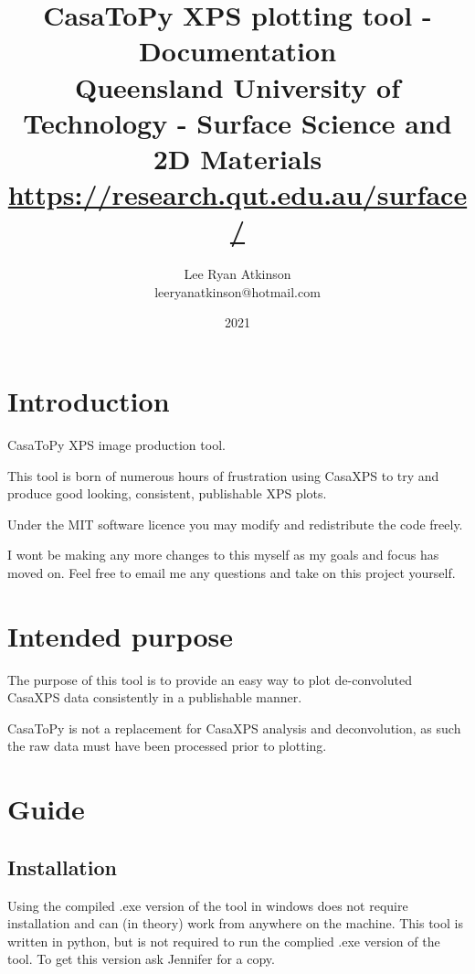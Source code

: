 \documentclass[10pt]{report}
\begin{document}
\title{CasaToPy XPS plotting tool - Documentation \\\large Queensland University of Technology - Surface Science and 2D Materials \href{https://research.qut.edu.au/surface/}{https://research.qut.edu.au/surface/}}
\author{Lee Ryan Atkinson \\ leeryanatkinson@hotmail.com}
\date{2021}
\maketitle
{}

\pagebreak

\section{Introduction}

CasaToPy XPS image production tool.

This tool is born of numerous hours of frustration using CasaXPS to try and produce good looking, consistent, publishable XPS plots.

Under the MIT software licence you may modify and redistribute the code freely.

I wont be making any more changes to this myself as my goals and focus has moved on. Feel free to email me any questions and take on this project yourself.

\section{Intended purpose}

The purpose of this tool is to provide an easy way to plot de-convoluted CasaXPS data consistently in a publishable manner.

CasaToPy is not a replacement for CasaXPS analysis and deconvolution, as such the raw data must have been processed prior to plotting.

\section{Guide}
\subsection{Installation}

Using the compiled .exe version of the tool in windows does not require installation and can (in theory) work from anywhere on the machine. This tool is written in python, but is not required to run the complied .exe version of the tool. To get this version ask Jennifer for a copy.
\end{document}

